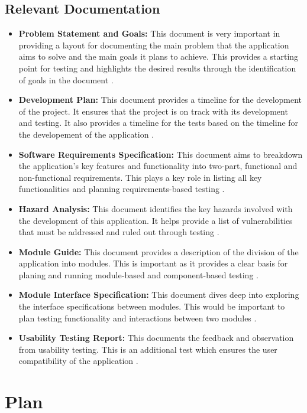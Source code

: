 \documentclass[12pt, titlepage]{article}
\begin{document}
\subsection{Relevant Documentation}

\begin{itemize}
    \item \textbf{Problem Statement and Goals:} This document is very important in providing a layout for documenting the main problem that the application aims to solve and the main goals it plans to achieve. This provides a starting point for testing and highlights the desired results through the identification of goals in the document \citet{PSG}. 
    \item \textbf{Development Plan:} This document provides a timeline for the development of the project. It ensures that the project is on track with its development and testing. It also provides a timeline for the tests based on the timeline for the developement of the application \citet{DevPlan}. 
    \item \textbf{Software Requirements Specification:}  This document aims to breakdown the application's key features and functionality into two-part, functional and non-functional requirements. This plays a key role in listing all key functionalities and planning requirements-based testing \citet{SRS}. 
    \item \textbf{Hazard Analysis:} This document identifies the key hazards involved with the development of this application. It helps provide a list of vulnerabilities that must be addressed and ruled out through testing \citet{HA}. 
    \item \textbf{Module Guide:} This document provides a description of the division of the application into modules. This is important as it provides a clear basis for planing and running module-based and component-based testing \citet{MG}. 
    \item \textbf{Module Interface Specification:} This document dives deep into exploring the interface specifications between modules. This would be important to plan testing functionality and interactions between two modules \citet{MIS}. 
    \item \textbf{Usability Testing Report:} This documents the feedback and observation from usability testing. This is an additional test which ensures the user compatibility of the application \citet{UT}. 
\end{itemize}

\section{Plan}
\end{document}
